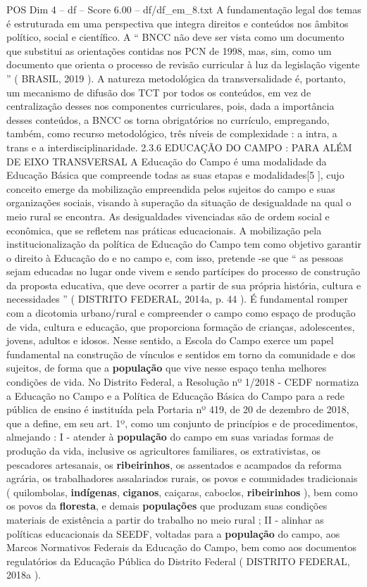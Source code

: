 \begin{textsample}{POS Dim 4 – df – Score 6.00 – df/df\_em\_8.txt}
A fundamentação legal dos temas é estruturada em uma perspectiva que integra direitos e conteúdos nos âmbitos político, social e científico.
A “ BNCC não deve ser vista como um documento que substitui as orientações contidas nos PCN de 1998, mas, sim, como um documento que orienta o processo de revisão curricular à luz da legislação vigente ” ( BRASIL, 2019 ).
A natureza metodológica da transversalidade é, portanto, um mecanismo de difusão dos TCT por todos os conteúdos, em vez de centralização desses nos componentes curriculares, pois, dada a importância desses conteúdos, a BNCC os torna obrigatórios no currículo, empregando, também, como recurso metodológico, três níveis de complexidade : a intra, a trans e a interdisciplinaridade. 2.3.6 EDUCAÇÃO DO CAMPO : PARA ALÉM DE EIXO TRANSVERSAL A Educação do Campo é uma modalidade da Educação Básica que compreende todas as suas etapas e modalidades[5 ], cujo conceito emerge da mobilização empreendida pelos sujeitos do campo e suas organizações sociais, visando à superação da situação de desigualdade na qual o meio rural se encontra.
As desigualdades vivenciadas são de ordem social e econômica, que se refletem nas práticas educacionais.
A mobilização pela institucionalização da política de Educação do Campo tem como objetivo garantir o direito à Educação do e no campo e, com isso, pretende -se que “ as pessoas sejam educadas no lugar onde vivem e sendo partícipes do processo de construção da proposta educativa, que deve ocorrer a partir de sua própria história, cultura e necessidades ” ( DISTRITO FEDERAL, 2014a, p. 44 ).
É fundamental romper com a dicotomia urbano/rural e compreender o campo como espaço de produção de vida, cultura e educação, que proporciona formação de crianças, adolescentes, jovens, adultos e idosos.
Nesse sentido, a Escola do Campo exerce um papel fundamental na construção de vínculos e sentidos em torno da comunidade e dos sujeitos, de forma que a \textbf{população} que vive nesse espaço tenha melhores condições de vida.
No Distrito Federal, a Resolução nº 1/2018 - CEDF normatiza a Educação no Campo e a Política de Educação Básica do Campo para a rede pública de ensino é instituída pela Portaria nº 419, de 20 de dezembro de 2018, que a define, em seu art. 1º, como um conjunto de princípios e de procedimentos, almejando : I - atender à \textbf{população} do campo em suas variadas formas de produção da vida, inclusive os agricultores familiares, os extrativistas, os pescadores artesanais, os \textbf{ribeirinhos}, os assentados e acampados da reforma agrária, os trabalhadores assalariados rurais, os povos e comunidades tradicionais ( quilombolas, \textbf{indígenas}, \textbf{ciganos}, caiçaras, caboclos, \textbf{ribeirinhos} ), bem como os povos da \textbf{floresta}, e demais \textbf{populações} que produzam suas condições materiais de existência a partir do trabalho no meio rural ; II - alinhar as políticas educacionais da SEEDF, voltadas para a \textbf{população} do campo, aos Marcos Normativos Federais da Educação do Campo, bem como aos documentos regulatórios da Educação Pública do Distrito Federal ( DISTRITO FEDERAL, 2018a ).

\end{textsample}
